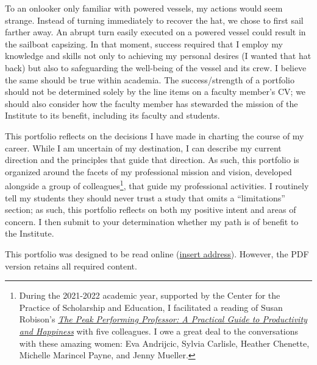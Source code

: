 \documentclass[
  letterpaper,
  DIV=11,
  numbers=noendperiod]{scrreprt}
\begin{document}
To an onlooker only familiar with powered vessels, my actions would seem
strange. Instead of turning immediately to recover the hat, we chose to
first sail farther away. An abrupt turn easily executed on a powered
vessel could result in the sailboat capsizing. In that moment, success
required that I employ my knowledge and skills not only to achieving my
personal desires (I wanted that hat back) but also to safeguarding the
well-being of the vessel and its crew. I believe the same should be true
within academia. The success/strength of a portfolio should not be
determined solely by the line items on a faculty member's CV; we should
also consider how the faculty member has stewarded the mission of the
Institute to its benefit, including its faculty and students.

This portfolio reflects on the decisions I have made in charting the
course of my career. While I am uncertain of my destination, I can
describe my current direction and the principles that guide that
direction. As such, this portfolio is organized around the facets of my
professional mission and vision, developed alongside a group of
colleagues\footnote{During the 2021-2022 academic year, supported by the
  Center for the Practice of Scholarship and Education, I facilitated a
  reading of Susan Robison's
  \href{http://peakperformingprofessor.com/ppp/}{\emph{The Peak
  Performing Professor: A Practical Guide to Productivity and
  Happiness}} with five colleagues. I owe a great deal to the
  conversations with these amazing women: Eva Andrijcic, Sylvia
  Carlisle, Heather Chenette, Michelle Marincel Payne, and Jenny
  Mueller.}, that guide my professional activities. I routinely tell my
students they should never trust a study that omits a ``limitations''
section; as such, this portfolio reflects on both my positive intent and
areas of concern. I then submit to your determination whether my path is
of benefit to the Institute.

\begin{tcolorbox}[enhanced jigsaw, coltitle=black, colframe=quarto-callout-note-color-frame, opacityback=0, rightrule=.15mm, bottomrule=.15mm, leftrule=.75mm, bottomtitle=1mm, colbacktitle=quarto-callout-note-color!10!white, breakable, titlerule=0mm, title=\textcolor{quarto-callout-note-color}{\faInfo}\hspace{0.5em}{Note}, left=2mm, toptitle=1mm, toprule=.15mm, colback=white, arc=.35mm, opacitybacktitle=0.6]

This portfolio was designed to be read online (\href{about:blank}{insert
address}). However, the PDF version retains all required content.

\end{tcolorbox}
\end{document}
